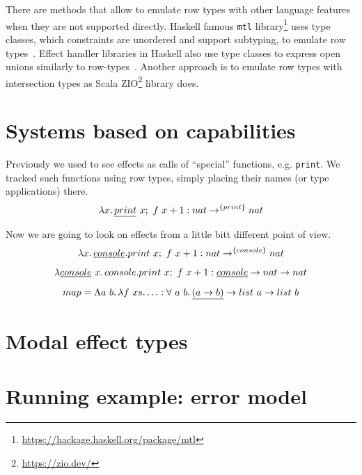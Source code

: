 \documentclass[conference]{IEEEtran}
\newcommand{\ap}{~}
\begin{document}
    There are methods that allow to emulate row types with other language features when they are not supported directly.
    Haskell famous \texttt{mtl} library\footnote{\url{https://hackage.haskell.org/package/mtl}} uses type classes, which constraints are unordered and support subtyping, to emulate row types~\cite{mtl}.
    Effect handler libraries in Haskell also use type classes to express open unions similarly to row-types~\cite{alacarte}.
    Another approach is to emulate row types with intersection types as Scala ZIO\footnote{\url{https://zio.dev/}} library does.



    \section{Systems based on capabilities}

    Previously we used to see effects as calls of ``special'' functions, e.g. \texttt{print}.
    We tracked such functions using row types, simply placing their names (or type applications) there.
    \[\lambda x\ldotp \underline{print}\ap x;~f\ap x + 1 : nat \to^{\{print\}} nat\]

    Now we are going to look on effects from a little bitt different point of view.
    \[\lambda x\ldotp \underline{console}.print\ap x;~f\ap x + 1 : nat \to^{\{console\}} nat\]

    \[\lambda \underline{console} \ap x \ldotp console.print\ap x;~f\ap x + 1 : \underline{console} \to nat \to nat\]


    \[map = \Lambda a \ap b\ldotp \lambda f\ap xs\ldotp \ldots : \forall \ap a \ap b\ldotp \underline{(a \to b)} \to list \ap a \to list \ap b \]





    \section{Modal effect types}



    \section{Running example: error model}
\end{document}
